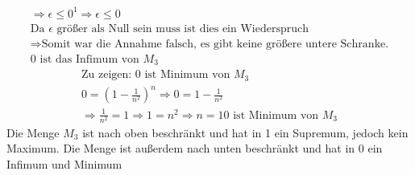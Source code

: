\documentclass{article}
\begin{document}
\begin{enumerate}[label = (\alph*)]
\begin{gather*}
                    \Rightarrow \epsilon \leq 0^1 \Rightarrow \epsilon \leq 0 \\
                    \text{Da } \epsilon \text{ größer als Null sein muss ist dies ein Wiederspruch} \\
                    \Rightarrow \text{Somit war die Annahme falsch, es gibt keine größere untere Schranke.} \\
                    \text{0 ist das Infimum von } M_3
                \end{gather*}
                \begin{gather*}
                    \text{Zu zeigen: 0 ist Minimum von } M_3 \\
                    0 =  {\left(1- \frac{1}{n^2}\right)}^n \Rightarrow 0 = 1- \frac{1}{n^2} \\
                    \Rightarrow \frac{1}{n^2} = 1 \Rightarrow 1 = n^2 \Rightarrow n = 1
                    \text{0 ist Minimum von } M_3
                \end{gather*}
            Die Menge \(M_3\) ist nach oben beschränkt und hat in 1 ein Supremum, jedoch kein Maximum.
            Die Menge ist außerdem nach unten beschränkt und hat in 0 ein Infimum und Minimum
        \end{enumerate}
\end{document}
